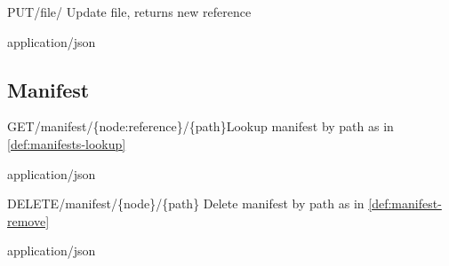 \begin{apiRoute}{PUT}{/file/ }{Update file, returns new reference}
{
}
{ }

\begin{routeParameter} 
\end{routeParameter}
\begin{headerParameter} 
\end{headerParameter}
\begin{routeResponse}{application/json}
\end{routeResponse}
\end{apiRoute}



\subsection{Manifest \statusgreen}\label{spec:api:manifest}




\begin{apiRoute}{GET}{/manifest/\{node:reference\}/\{path\}}{Lookup manifest by path as in \ref{def:manifests-lookup}}
{
}
{ }

\begin{routeParameter} 
\end{routeParameter}
\begin{routeResponse}{application/json}
\end{routeResponse}
\end{apiRoute}



\begin{apiRoute}{DELETE}{/manifest/\{node\}/\{path\} }{Delete manifest by path as in \ref{def:manifest-remove}}
{
}
{ }

\begin{routeParameter} 
\end{routeParameter}
\begin{routeResponse}{application/json}
\end{routeResponse}
\end{apiRoute}



